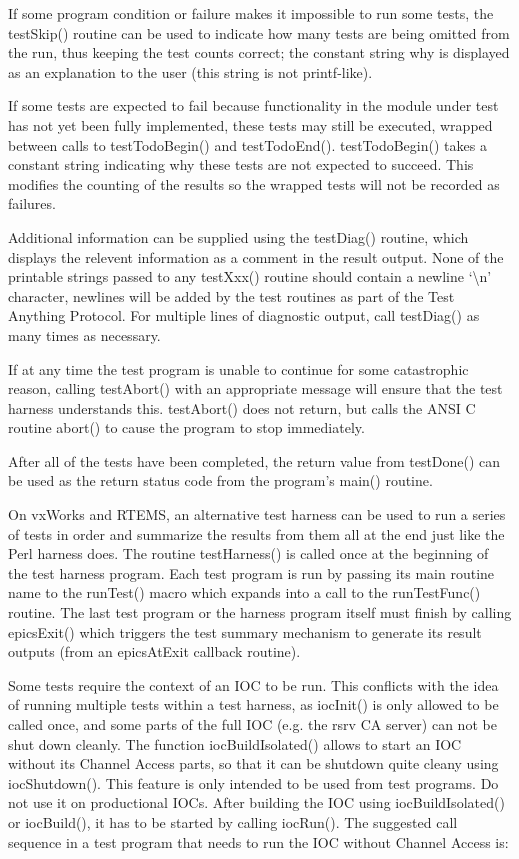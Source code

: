 If some program condition or failure makes it impossible to run some tests, the testSkip() routine can be used to indicate how many tests are being omitted from the run, thus keeping the test counts correct; the constant string why is displayed as an explanation to the user (this string is not printf-like).

If some tests are expected to fail because functionality in the module under test has not yet been fully implemented, these tests may still be executed, wrapped between calls to testTodoBegin() and testTodoEnd().
testTodoBegin() takes a constant string indicating why these tests are not expected to succeed.
This modifies the counting of the results so the wrapped tests will not be recorded as failures.

Additional information can be supplied using the testDiag() routine, which displays the relevent information as a comment in the result output.
None of the printable strings passed to any testXxx() routine should contain a newline `\textbackslash{}n' character, newlines will be added by the test routines as part of the Test Anything Protocol.
For multiple lines of diagnostic output, call testDiag() as many times as necessary.

If at any time the test program is unable to continue for some catastrophic reason, calling testAbort() with an appropriate message will ensure that the test harness understands this. testAbort() does not return, but calls the ANSI C routine abort() to cause the program to stop immediately.

After all of the tests have been completed, the return value from testDone() can be used as the return status code from the program's main() routine.

On vxWorks and RTEMS, an alternative test harness can be used to run a series of tests in order and summarize the results from them all at the end just like the Perl harness does.
The routine testHarness() is called once at the beginning of the test harness program.
Each test program is run by passing its main routine name to the runTest() macro which expands into a 
call to the runTestFunc() routine.
The last test program or the harness program itself must finish by calling epicsExit() which triggers the test summary mechanism to generate its result outputs (from an epicsAtExit callback routine).

Some tests require the context of an IOC to be run. This conflicts with the idea of running multiple tests within a test harness, as iocInit() is only allowed to be called once, and some parts of the full IOC (e.g. the rsrv CA server) can not be shut down cleanly.
The function iocBuildIsolated() allows to start an IOC without its Channel Access parts, so that it can be shutdown quite cleany using iocShutdown(). This feature is only intended to be used from test programs. Do not use it on productional IOCs. After building the IOC using iocBuildIsolated() or iocBuild(), it has to be started by calling iocRun(). The suggested call sequence in a test program that needs to run the IOC without Channel Access is:

